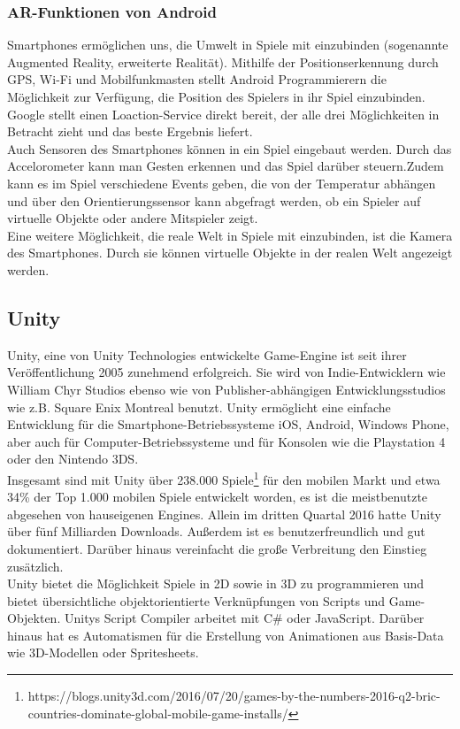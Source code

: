 \documentclass[extern,palatino]{cgBA}
\begin{document}
\subsubsection{AR-Funktionen von Android}
Smartphones ermöglichen uns, die Umwelt in Spiele mit einzubinden (sogenannte Augmented Reality, erweiterte Realität). Mithilfe der Positionserkennung durch GPS, Wi-Fi und Mobilfunkmasten stellt Android Programmierern die Möglichkeit zur Verfügung, die Position des Spielers in ihr Spiel einzubinden. Google stellt einen Loaction-Service direkt bereit\cite{and3}, der alle drei Möglichkeiten in Betracht zieht und das beste Ergebnis liefert.\\
Auch Sensoren des Smartphones können in ein Spiel eingebaut werden. Durch das Accelorometer kann man Gesten erkennen und das Spiel darüber steuern.Zudem kann es im Spiel verschiedene Events geben, die von der Temperatur abhängen und über den Orientierungssensor kann abgefragt werden, ob ein Spieler auf virtuelle Objekte oder andere Mitspieler zeigt.\\
Eine weitere Möglichkeit, die reale Welt in Spiele mit einzubinden, ist die Kamera des Smartphones. Durch sie können virtuelle Objekte in der realen Welt angezeigt werden. 
\newpage
\subsection{Unity}
Unity, eine von Unity Technologies entwickelte Game-Engine ist seit ihrer Veröffentlichung 2005 zunehmend erfolgreich. %
	Sie wird von Indie-Entwicklern wie William Chyr Studios ebenso wie von Publisher-abhängigen Entwicklungsstudios wie z.B. Square Enix Montreal benutzt. Unity ermöglicht eine einfache Entwicklung für die Smartphone-Betriebssysteme iOS, Android, Windows Phone, aber auch für Computer-Betriebssysteme und für Konsolen wie die Playstation 4 oder den Nintendo 3DS.
	\\Insgesamt sind mit Unity über 238.000 Spiele\footnote{https://blogs.unity3d.com/2016/07/20/games-by-the-numbers-2016-q2-bric-countries-dominate-global-mobile-game-installs/} für den mobilen Markt 
	und etwa 34\% der Top 1.000 mobilen Spiele entwickelt worden, es ist die meistbenutzte abgesehen von hauseigenen Engines. Allein im dritten Quartal 2016 hatte Unity über fünf Milliarden Downloads. Außerdem ist es benutzerfreundlich und gut dokumentiert. Darüber hinaus vereinfacht die große Verbreitung den Einstieg zusätzlich.
	\\Unity bietet die Möglichkeit Spiele in 2D sowie in 3D zu programmieren und bietet übersichtliche objektorientierte Verknüpfungen von Scripts und Game-Objekten. Unitys Script Compiler arbeitet mit C\# oder JavaScript. Darüber hinaus hat es Automatismen für die Erstellung von Animationen aus Basis-Data wie 3D-Modellen oder Spritesheets. %
	\newpage 
\end{document}
